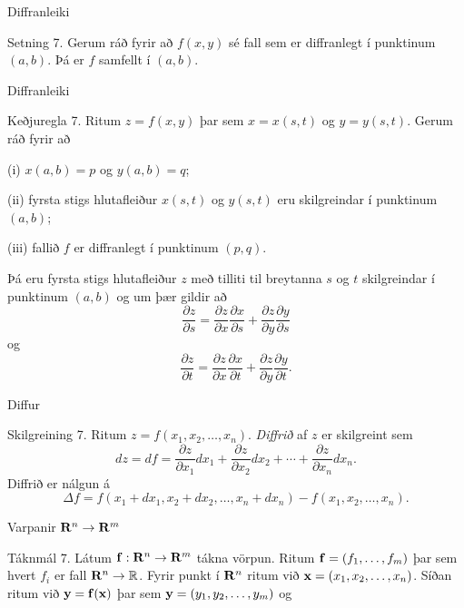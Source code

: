 \begin{frame}{Diffranleiki} 

\begin {block}{Setning 7.}
  Gerum ráð fyrir að $f(x,y)$ sé fall sem er
diffranlegt í punktinum $(a,b)$.  Þá er $f$ samfellt í $(a,b)$.

\end{block}

\end{frame}

\begin{frame}{Diffranleiki} 

\begin {block}{Keðjuregla 7.}
 Ritum $z=f(x,y)$ þar sem $x=x(s,t)$ og
$y=y(s,t)$.  Gerum ráð fyrir að 

(i) $x(a,b)=p$ og $y(a,b)=q$;

(ii) fyrsta stigs hlutafleiður $x(s,t)$ og $y(s,t)$ eru skilgreindar í
punktinum $(a,b)$;

(iii)  fallið $f$ er diffranlegt í punktinum $(p,q)$.

Þá eru fyrsta stigs hlutafleiður $z$ með tilliti til breytanna $s$ og
$t$ skilgreindar í punktinum $(a,b)$ og um þær gildir að 
$$\frac{\partial z}{\partial s}=
\frac{\partial z}{\partial x}\frac{\partial x}{\partial s}
+\frac{\partial z}{\partial y}\frac{\partial y}{\partial s}$$
og
$$\frac{\partial z}{\partial t}=
\frac{\partial z}{\partial x}\frac{\partial x}{\partial t}
+\frac{\partial z}{\partial y}\frac{\partial y}{\partial t}.$$
\end{block}

\end{frame}

\begin{frame}{Diffur} 

\begin {block}{Skilgreining 7.}
  Ritum $z=f(x_1, x_2, \ldots, x_n)$.  {\em
  Diffrið} af $z$ er skilgreint sem 
$$dz=df=\frac{\partial z}{\partial x_1}dx_1
+\frac{\partial z}{\partial x_2}dx_2
+\cdots+\frac{\partial z}{\partial x_n}dx_n.$$
Diffrið er nálgun á 
$$\Delta f=f(x_1+dx_1, x_2+dx_2,\ldots,
x_n+dx_n)-f(x_1,x_2,\ldots,x_n).$$
\end{block}

\end{frame}

\begin{frame}{Varpanir $\mbox{${\bf R}^n$}\rightarrow\mbox{${\bf R}^m$}$} 
\begin {block}{Táknmál 7.}
Látum $\mbox{${\bf f}$}:\mbox{${\bf R}^n$}\rightarrow\mbox{${\bf R}^m$}$ tákna vörpun.
Ritum $\mbox{${\bf f}$}=(f_1,\ldots,f_m)$ þar sem hvert $f_i$ er fall
$\mbox{${\bf R}^n$}\rightarrow{\mathbb R}$.  Fyrir punkt í $\mbox{${\bf R}^n$}$ ritum við
$\mbox{${\bf x}$}=(x_1,x_2,\ldots,x_n)$.  Síðan ritum við $\mbox{${\bf y}$}=\mbox{${\bf f}$}(\mbox{${\bf x}$})$ þar sem 
$\mbox{${\bf y}$}=(y_1,y_2,\ldots,y_m)$ og 
\end{block}

\end{frame}

